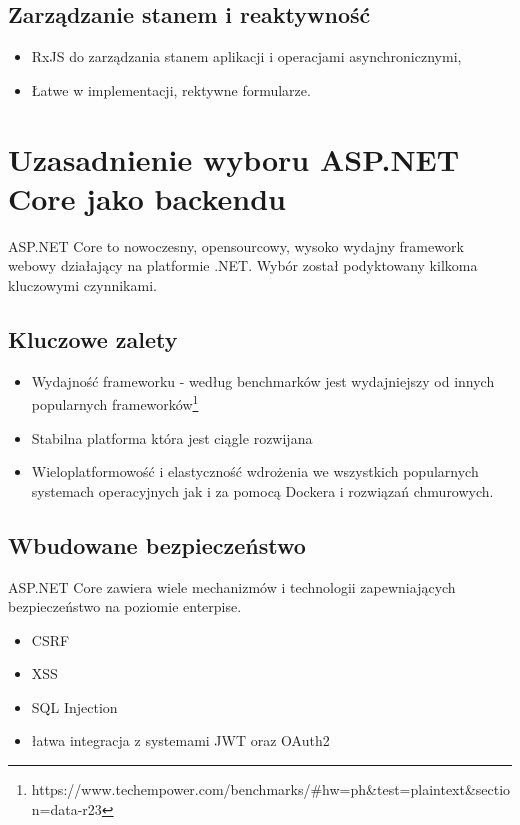 \subsection{Zarządzanie stanem i reaktywność}
\begin{itemize}
	\item RxJS do zarządzania stanem aplikacji i operacjami asynchronicznymi,
	\item Łatwe w implementacji, rektywne formularze.
\end{itemize}

\section{Uzasadnienie wyboru ASP.NET Core jako backendu}

ASP.NET Core to nowoczesny, opensourcowy, wysoko wydajny framework webowy działający na platformie .NET.
Wybór został podyktowany kilkoma kluczowymi czynnikami.

\subsection{Kluczowe zalety}
\begin{itemize}
	\item Wydajność frameworku - według benchmarków jest wydajniejszy od innych popularnych frameworków\footnote{https://www.techempower.com/benchmarks/#hw=ph&test=plaintext&section=data-r23}
	\item Stabilna platforma która jest ciągle rozwijana
	\item Wieloplatformowość i elastyczność wdrożenia we wszystkich popularnych systemach operacyjnych jak i za pomocą Dockera i rozwiązań chmurowych.
\end{itemize}

\subsection{Wbudowane bezpieczeństwo}
ASP.NET Core zawiera wiele mechanizmów i technologii zapewniających bezpieczeństwo na poziomie enterpise.
\begin{itemize}
	\item CSRF
	\item XSS
	\item SQL Injection
	\item łatwa integracja z systemami JWT oraz OAuth2
\end{itemize}

